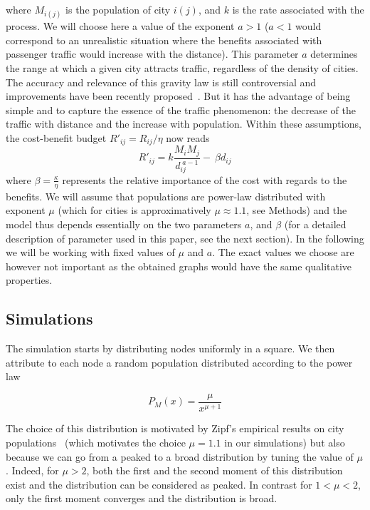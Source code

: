 where $M_{i(j)}$ is the population of city $i(j)$, and $k$ is the rate
associated with the process. We will choose here a value of the exponent $a>1$
($a<1$ would correspond to an unrealistic situation where the benefits
associated with passenger traffic would increase with the distance). This
parameter $a$ determines the range at which a given city attracts traffic,
regardless of the density of cities. The accuracy and relevance of this gravity
law is still controversial and improvements have been recently
proposed~\cite{Simini:2012,Lenormand:2012}. But it has the advantage of being
simple and to capture the essence of the traffic phenomenon: the decrease of the
traffic with distance and the increase with population. Within these
assumptions, the cost-benefit budget $R'_{ij}=R_{ij}/\eta$ now reads
\begin{equation} \label{eq:R0} R'_{ij} = k\frac{M_i M_j}{d_{ij}^{\;a-1}} - \:
\beta d_{ij} \end{equation} where $\beta = \frac{\kappa}{\eta}$ represents the
relative importance of the cost with regards to the benefits. We will assume
that populations are power-law distributed with exponent $\mu$ (which for cities
is approximatively $\mu\approx 1.1$, see Methods) and the model thus depends
essentially on the two parameters $a$, and $\beta$ (for a detailed description
of parameter used in this paper, see the next section). In the following we will
be working with fixed values of $\mu$ and $a$. The exact values we choose are
however not important as the obtained graphs would have the same qualitative
properties.


\subsection{Simulations} 

The simulation starts by distributing nodes uniformly in a square. We then
attribute to each node a random population distributed according to the power
law

\begin{equation}
    P_M(x) = \frac{\mu}{x^{\mu+1}}
\end{equation}

The choice of this distribution is motivated by Zipf's empirical results on city
populations~\cite{Zipf:1949} (which motivates the choice $\mu=1.1$ in our
simulations) but also because we can go from a peaked to a broad distribution by
tuning the value of $\mu$. Indeed, for $\mu>2$, both the first and the second
moment of this distribution exist and the distribution can be considered as
peaked. In contrast for $1<\mu<2$, only the first moment converges and the
distribution is broad.

